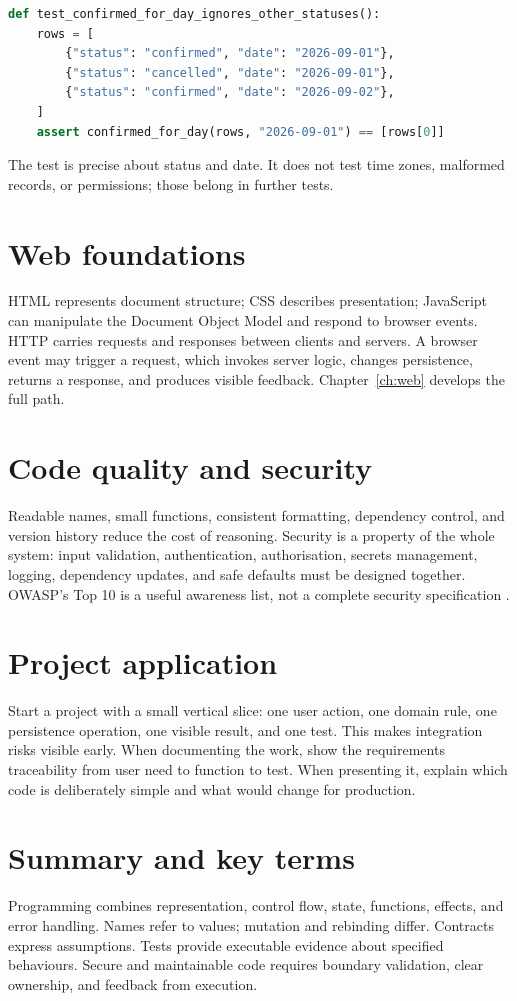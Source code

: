 \begin{lstlisting}[language=Python,caption={A small test for the appointment filter.}]
def test_confirmed_for_day_ignores_other_statuses():
    rows = [
        {"status": "confirmed", "date": "2026-09-01"},
        {"status": "cancelled", "date": "2026-09-01"},
        {"status": "confirmed", "date": "2026-09-02"},
    ]
    assert confirmed_for_day(rows, "2026-09-01") == [rows[0]]
\end{lstlisting}

The test is precise about status and date. It does not test time zones, malformed records, or permissions; those belong in further tests.

\section{Web foundations}
HTML represents document structure; CSS describes presentation; JavaScript can manipulate the Document Object Model and respond to browser events. HTTP carries requests and responses between clients and servers. A browser event may trigger a request, which invokes server logic, changes persistence, returns a response, and produces visible feedback. Chapter~\ref{ch:web} develops the full path.

\section{Code quality and security}
Readable names, small functions, consistent formatting, dependency control, and version history reduce the cost of reasoning. Security is a property of the whole system: input validation, authentication, authorisation, secrets management, logging, dependency updates, and safe defaults must be designed together. OWASP's Top 10 is a useful awareness list, not a complete security specification \citep{owasptop10}.

\section{Project application}
Start a project with a small vertical slice: one user action, one domain rule, one persistence operation, one visible result, and one test. This makes integration risks visible early. When documenting the work, show the requirements traceability from user need to function to test. When presenting it, explain which code is deliberately simple and what would change for production.

\section{Summary and key terms}
Programming combines representation, control flow, state, functions, effects, and error handling. Names refer to values; mutation and rebinding differ. Contracts express assumptions. Tests provide executable evidence about specified behaviours. Secure and maintainable code requires boundary validation, clear ownership, and feedback from execution.

